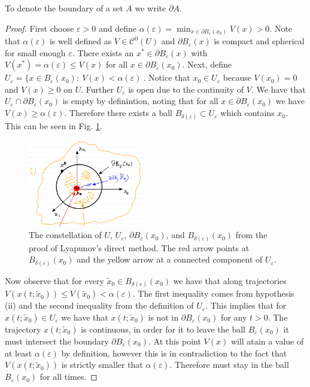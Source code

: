 	\begin{remark}[]
		To denote the boundary of a set $A$ we write $\partial A$.
	\end{remark}
\begin{proof}
	
	First choose $\varepsilon > 0$ and define $\alpha(\varepsilon)= \min_{x\in \partial B_\varepsilon(x_0)} V(x) > 0$. Note that $\alpha(\varepsilon)$ is well defined as $V\in \mathcal{C}^{0}(U)$ and $\partial B_{\varepsilon}(x)$ is compact and spherical for small enough $\varepsilon$. There exists an $x^{*} \in \partial B_{\varepsilon}(x)$ with $V(x^{*}) = \alpha(\varepsilon) \leq V(x)$ for all $x\in \partial B_{\varepsilon}(x_0)$. Next, define $U_{\varepsilon}= \{ x\in B_{\varepsilon}(x_0):\ V(x) < \alpha(\varepsilon)  \ $. Notice that $x_0 \in U_{\varepsilon}$ because $V(x_0) =0$ and $V(x)\geq 0$ on $U$. Further $U_{\varepsilon}$ is open due to the continuity of $V$. We have that  $U_{\varepsilon} \cap \partial B_{\varepsilon}(x_ 0) $ is empty by definintion, noting that for all $x\in \partial B_{\varepsilon}(x_0)$ we have $V(x) \geq \alpha(\varepsilon) $. Therefore there exists a ball $B_{\delta(\varepsilon)} \subset U_{\varepsilon} $ which contains $x_0$. This can be seen in Fig. \ref{fig:lyap_pf_1}.
\begin{figure}[h!]
	\centering
	\includegraphics[width=0.45\textwidth]{figures/ch2/22lyap_pf_1.png}
	\caption{The constellation of $U$, $U_\varepsilon$, $\partial B_{\varepsilon}(x_0)$, and $B_{\delta(\varepsilon)}(x_0)$ from the proof of Lyapunov's direct method. The red arrow points at $B_{\delta(\varepsilon)}(x_0)$ and the yellow arrow at a connected component of $U_\varepsilon$.}
	\label{fig:lyap_pf_1}
\end{figure}

Now observe that for every $\tilde{x}_{0} \in B_{\delta(\varepsilon)}(x_0)$ we have that along trajectories $V(x(t; \tilde{x}_{0})) \leq V(\tilde{x}_{0}) < \alpha(\varepsilon)$. The first inequality comes from hypothesis (ii) and the second inequality from the definition of $U_{\varepsilon}$. This implies that for $x(t; \tilde{x}_0) \in U_{\varepsilon}$ we have that $x(t; \tilde{x}_{0})$ is not in $\partial B_{\varepsilon}(x_0)$ for any $t> 0$. The trajectory $x(t; \tilde{x}_0)$ is continuous, in order for it to leave the ball $B_{\varepsilon}(x_0)$ it must intersect the boundary $\partial B_{\varepsilon}(x_0)$. At this point $V(x)$ will atain a value of at least $\alpha(\varepsilon)$ by definition, however this is in contradiction to the fact that $V(x(t;\tilde{x}_0))$ is strictly smaller that $\alpha(\varepsilon)$. Therefore must stay in the ball $B_{\varepsilon}(x_0)$ for all times.
\end{proof}

